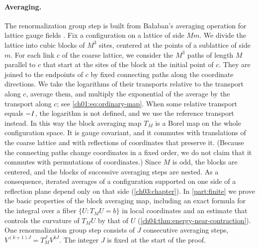 \paragraph{Averaging.}
The renormalization group step is built from Bałaban's averaging operation for lattice gauge fields \cite{Balaban1985Averaging}. Fix a configuration on a lattice of side $Mm$. We divide the lattice into cubic blocks of $M^3$ sites, centered at the points of a sublattice of side $m$. For each link $c$ of the coarse lattice, we consider the $M^3$ paths of length $M$ parallel to $c$ that start at the sites of the block at the initial point of $c$. They are joined to the endpoints of $c$ by fixed connecting paths along the coordinate directions. We take the logarithms of their transports relative to the transport along $c$, average them, and multiply the exponential of the average by the transport along $c$; see \eqref{ch01:eq:ordinary-map}. When some relative transport equals $-I$, the logarithm is not defined, and we use the reference transport instead. In this way the block averaging map $T_M$ is a Borel map on the whole configuration space. It is gauge covariant, and it commutes with translations of the coarse lattice and with reflections of coordinates that preserve it. (Because the connecting paths change coordinates in a fixed order, we do not claim that it commutes with permutations of coordinates.) Since $M$ is odd, the blocks are centered, and the blocks of successive averaging steps are nested. As a consequence, iterated averages of a configuration supported on one side of a reflection plane depend only on that side (\cref{ch03:chapter}). In \cref{part:finite} we prove the basic properties of the block averaging map, including an exact formula for the integral over a fiber $\{U:T_MU=b\}$ in local coordinates and an estimate that controls the curvature of $T_MU$ by that of $U$ (\cref{ch04:thm:energy-near-contraction}). One renormalization group step consists of $J$ consecutive averaging steps, $V^{(k+1)J}=T_M^JV^{kJ}$. The integer $J$ is fixed at the start of the proof.

